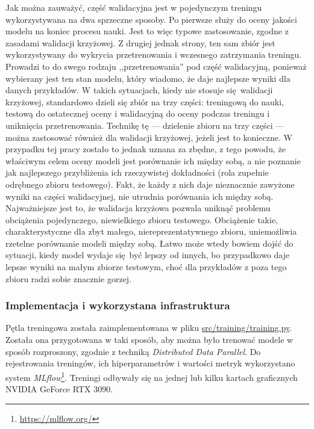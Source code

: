 Jak można zauważyć, część walidacyjna jest w pojedynczym treningu wykorzystywana na dwa sprzeczne
sposoby. Po pierwsze służy do oceny jakości modelu na koniec procesu nauki. Jest to więc typowe
zastosowanie, zgodne z zasadami walidacji krzyżowej. Z drugiej jednak strony, ten sam zbiór jest
wykorzystywany do wykrycia przetrenowania i wczesnego zatrzymania treningu. Prowadzi to do swego
rodzaju ,,przetrenowania'' pod część walidacyjną, ponieważ wybierany jest ten stan modelu, który
wiadomo, że daje najlepsze wyniki dla danych przykładów. W takich sytuacjach, kiedy nie stosuje
się walidacji krzyżowej, standardowo dzieli się zbiór na trzy części: treningową do nauki, testową
do ostatecznej oceny i walidacyjną do oceny podczas treningu i uniknięcia przetrenowania. Technikę
tę --- dzielenie zbioru na trzy części --- można zastosować również dla walidacji krzyżowej, jeżeli
jest to konieczne. W przypadku tej pracy zostało to jednak uznana za zbędne, z tego powodu, że
właściwym celem oceny modeli jest porównanie ich między sobą, a nie poznanie jak najlepszego
przybliżenia ich rzeczywistej dokładności (rola zupełnie odrębnego zbioru testowego). Fakt, że każdy
z nich daje nieznacznie zawyżone wyniki na części walidacyjnej, nie utrudnia porównania ich między
sobą. Najważniejsze jest to, że walidacja krzyżowa pozwala uniknąć problemu obciążenia pojedynczego,
niewielkiego zbioru testowego. Obciążenie takie, charakterystyczne dla zbyt małego,
niereprezentatywnego zbioru, uniemożliwia rzetelne porównanie modeli między sobą. Łatwo może wtedy
bowiem dojść do sytuacji, kiedy model wydaje się być lepszy od innych, bo przypadkowo daje lepsze
wyniki na małym zbiorze testowym, choć dla przykładów z poza tego zbioru radzi sobie znacznie
gorzej.

\subsubsection{Implementacja i wykorzystana infrastruktura}

Pętla treningowa została zaimplementowana w pliku \url{src/training/training.py}. Została ona
przygotowana w taki sposób, aby można było trenować modele w sposób rozproszony, zgodnie z techniką
\emph{Distributed Data Parallel}. Do rejestrowania treningów, ich hiperparametrów i wartości metryk
wykorzystano system \emph{MLflow}\footnote{\url{https://mlflow.org/}}. Treningi odbywały się na
jednej lub kilku kartach graficznych NVIDIA GeForce RTX 3090.

